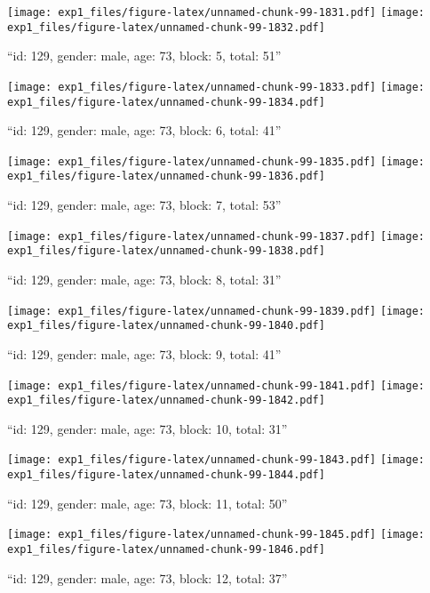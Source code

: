 \documentclass[,]{article}
\begin{document}
\texttt{[image: exp1\_files/figure-latex/unnamed-chunk-99-1831.pdf]}
\texttt{[image: exp1\_files/figure-latex/unnamed-chunk-99-1832.pdf]}

\newpage
[1] 

``id: 129, gender: male, age: 73, block: 5, total: 51''

\texttt{[image: exp1\_files/figure-latex/unnamed-chunk-99-1833.pdf]}
\texttt{[image: exp1\_files/figure-latex/unnamed-chunk-99-1834.pdf]}

\newpage
[1] 

``id: 129, gender: male, age: 73, block: 6, total: 41''

\texttt{[image: exp1\_files/figure-latex/unnamed-chunk-99-1835.pdf]}
\texttt{[image: exp1\_files/figure-latex/unnamed-chunk-99-1836.pdf]}

\newpage
[1] 

``id: 129, gender: male, age: 73, block: 7, total: 53''

\texttt{[image: exp1\_files/figure-latex/unnamed-chunk-99-1837.pdf]}
\texttt{[image: exp1\_files/figure-latex/unnamed-chunk-99-1838.pdf]}

\newpage
[1] 

``id: 129, gender: male, age: 73, block: 8, total: 31''

\texttt{[image: exp1\_files/figure-latex/unnamed-chunk-99-1839.pdf]}
\texttt{[image: exp1\_files/figure-latex/unnamed-chunk-99-1840.pdf]}

\newpage
[1] 

``id: 129, gender: male, age: 73, block: 9, total: 41''

\texttt{[image: exp1\_files/figure-latex/unnamed-chunk-99-1841.pdf]}
\texttt{[image: exp1\_files/figure-latex/unnamed-chunk-99-1842.pdf]}

\newpage
[1] 

``id: 129, gender: male, age: 73, block: 10, total: 31''

\texttt{[image: exp1\_files/figure-latex/unnamed-chunk-99-1843.pdf]}
\texttt{[image: exp1\_files/figure-latex/unnamed-chunk-99-1844.pdf]}

\newpage
[1] 

``id: 129, gender: male, age: 73, block: 11, total: 50''

\texttt{[image: exp1\_files/figure-latex/unnamed-chunk-99-1845.pdf]}
\texttt{[image: exp1\_files/figure-latex/unnamed-chunk-99-1846.pdf]}

\newpage
[1] 

``id: 129, gender: male, age: 73, block: 12, total: 37''
\end{document}
